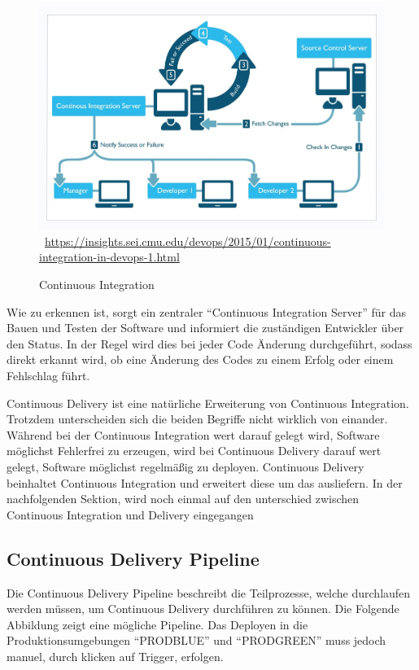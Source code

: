 \begin{figure}[htb]
    \centering 
    \includegraphics[width=\linewidth]{content/images/continuous_integration}\
    \quelle\url{https://insights.sei.cmu.edu/devops/2015/01/continuous-integration-in-devops-1.html}
    \caption[Continuous Integration]{Continuous Integration\\}
    \label{fig:ContinuousIntegration}  
\end{figure}\noindent 
Wie zu erkennen ist, sorgt ein zentraler "`Continuous Integration Server"' für das Bauen und Testen der Software und informiert die zuständigen Entwickler über den Status. In der Regel wird dies bei jeder Code Änderung durchgeführt, sodass direkt erkannt wird, ob eine Änderung des Codes zu einem Erfolg oder einem Fehlschlag führt.

Continuous Delivery ist eine natürliche Erweiterung von Continuous Integration. Trotzdem unterscheiden sich die beiden Begriffe nicht wirklich von einander. Während bei der Continuous Integration wert darauf gelegt wird, Software möglichst Fehlerfrei zu erzeugen, wird bei Continuous Delivery  darauf wert gelegt, Software möglichst regelmäßig zu deployen. Continuous Delivery beinhaltet Continuous Integration und erweitert diese um das ausliefern. In der nachfolgenden Sektion, wird noch einmal auf den unterschied zwischen Continuous Integration und Delivery eingegangen

\subsection{Continuous Delivery Pipeline}
\label{subsec:Continuous Delivery Pipeline}
Die Continuous Delivery Pipeline beschreibt die Teilprozesse, welche durchlaufen werden müssen, um Continuous Delivery durchführen zu können. Die Folgende Abbildung zeigt eine mögliche Pipeline. Das Deployen in die Produktionsumgebungen "`PRODBLUE"' und "`PRODGREEN"' muss jedoch manuel, durch klicken auf Trigger, erfolgen.

